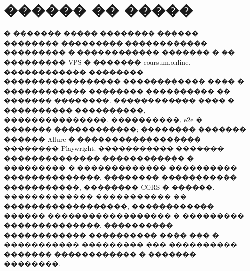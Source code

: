 \section{������ �� �����}

� ������� ����� �������� ������ �������� ��������� ������������ ��������� � ������������ ������� � �� ��������� VPS � ������� coursum.online. ������������ �������� ����������������� ������������ ���� � ������������ �������� ���������� �� ������� ��������. ������������ ���� � ���������� ����������, ���������������, ����������, e2e � ������� ������������; �������� ������� ������ Allure � ������������������ �������� Playwright. ����������� ������� �������������� ������������ � ��������� � ������������� ���������� ��������������, �������� �����������-�����������, �������� CORS � ������. ������������� ����������� �� ������������������, ������������ ������ ������������������ � ��������� ��������������. ���������� ������������ ���������� ���� ��� � ����������� ��������� ��� ���������� ������� ������������ � ������� ��������.
